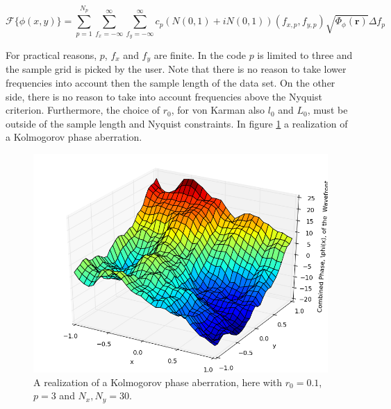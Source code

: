 \documentclass{article}
\begin{document}
\begin{equation}
\mathcal{F}\{\phi(x,y)\} = \sum \limits_{p=1}^{N_p} \sum \limits_{f_x=-\infty}^\infty \sum \limits_{f_y=-\infty}^\infty c_p \left( N(0,1) + i N(0,1) \right)(f_{x,p},f_{y,p}) \sqrt{\Phi_{\phi}(\textbf{r})} \Delta f_p
\label{eq_wfg54}
\end{equation}

For practical reasons, $p$, $f_x$ and $f_y$ are finite. In the code $p$ is limited to three and the sample grid is picked by the user. Note that there is no reason to take lower frequencies into account then the sample length of the data set. On the other side, there is no reason to take into account frequencies above the Nyquist criterion. Furthermore, the choice of $r_0$, for von Karman also $l_0$ and $L_0$, must be outside of the sample length and Nyquist constraints. In figure \ref{fig_wfg05} a realization of a Kolmogorov phase aberration.

\begin{figure}[H]
	\center
	\includegraphics[height=1.0\textwidth, height=.3\textwidth]{Figures/kolmogorov.png}
	\caption{A realization of a Kolmogorov phase aberration, here with $r_0 = 0.1$, $p=3$ and $N_x,N_y = 30$.}
	\label{fig_wfg05}
\end{figure}

\newpage


\end{document}
